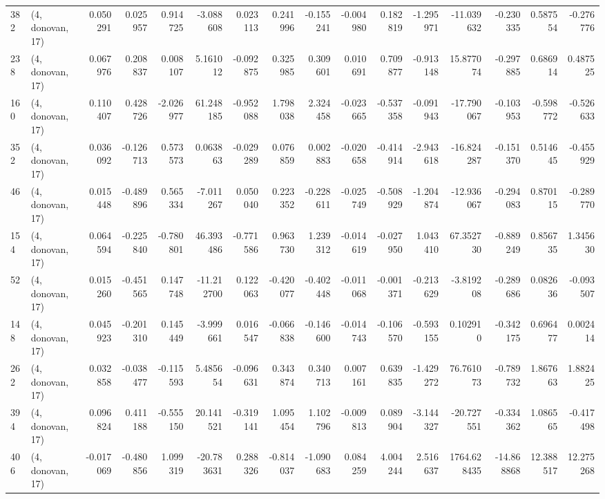\begin{tabular}{llrrrrrrrrrrrrrr}
382 &  (4, donovan, 17) &   0.050291 &  0.025957 &  0.914725 &  -3.088608 &  0.023113 &   0.241996 & -0.155241 & -0.004980 &  0.182819 & -1.295971 &   -11.039632 &  -0.230335 &   0.587554 &  -0.276776 \\
238 &  (4, donovan, 17) &   0.067976 &  0.208837 &  0.008107 &   5.161012 & -0.092875 &   0.325985 &  0.309601 &  0.010691 &  0.709877 & -0.913148 &    15.877074 &  -0.297885 &   0.686914 &   0.487525 \\
160 &  (4, donovan, 17) &   0.110407 &  0.428726 & -2.026977 &  61.248185 & -0.952088 &   1.798038 &  2.324458 & -0.023665 & -0.537358 & -0.091943 &   -17.790067 &  -0.103953 &  -0.598772 &  -0.526633 \\
352 &  (4, donovan, 17) &   0.036092 & -0.126713 &  0.573573 &   0.063863 & -0.029289 &   0.076859 &  0.002883 & -0.020658 & -0.414914 & -2.943618 &   -16.824287 &  -0.151370 &   0.514645 &  -0.455929 \\
46  &  (4, donovan, 17) &   0.015448 & -0.489896 &  0.565334 &  -7.011267 &  0.050040 &   0.223352 & -0.228611 & -0.025749 & -0.508929 & -1.204874 &   -12.936067 &  -0.294083 &   0.870115 &  -0.289770 \\
154 &  (4, donovan, 17) &   0.064594 & -0.225840 & -0.780801 &  46.393486 & -0.771586 &   0.963730 &  1.239312 & -0.014619 & -0.027950 &  1.043410 &    67.352730 &  -0.889249 &   0.856735 &   1.345630 \\
52  &  (4, donovan, 17) &   0.015260 & -0.451565 &  0.147748 & -11.212700 &  0.122063 &  -0.420077 & -0.402448 & -0.011068 & -0.001371 & -0.213629 &    -3.819208 &  -0.289686 &   0.082636 &  -0.093507 \\
148 &  (4, donovan, 17) &   0.045923 & -0.201310 &  0.145449 &  -3.999661 &  0.016547 &  -0.066838 & -0.146600 & -0.014743 & -0.106570 & -0.593155 &     0.102910 &  -0.342175 &   0.696477 &   0.002414 \\
262 &  (4, donovan, 17) &   0.032858 & -0.038477 & -0.115593 &   5.485654 & -0.096631 &   0.343874 &  0.340713 &  0.007161 &  0.639835 & -1.429272 &    76.761073 &  -0.789732 &   1.867663 &   1.882425 \\
394 &  (4, donovan, 17) &   0.096824 &  0.411188 & -0.555150 &  20.141521 & -0.319141 &   1.095454 &  1.102796 & -0.009813 &  0.089904 & -3.144327 &   -20.727551 &  -0.334362 &   1.086565 &  -0.417498 \\
406 &  (4, donovan, 17) &  -0.017069 & -0.480856 &  1.099319 & -20.783631 &  0.288326 &  -0.814037 & -1.090683 &  0.084259 &  4.004244 &  2.516637 &  1764.628435 & -14.868868 &  12.388517 &  12.275268 \\

\end{tabular}

